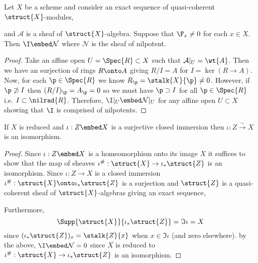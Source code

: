 \documentclass[12pt]{article}
\begin{document}
\newcommand{\Nil}{\mathcal{N}}

\begin{lemma}
Let $X$ be a scheme and consider an exact sequence of quasi-coherent $\struct{X}$-modules,
\begin{center}
\end{center}
and $\mathcal{A}$ is a sheaf of $\struct{X}$-algebra. 
Suppose that $\F_x \neq 0$ for each $x \in X$. Then $\I \embed \Nil$ where $\Nil$ is the sheaf of nilpotent.
\end{lemma}

\begin{proof}
Take an affine open $U = \Spec{R} \subset X$ such that $\mathcal{A} |_{U} = \wt{A}$. Then we have an surjection of rings $R \onto A$ giving $R/I = A$ for $I = \ker{(R \to A)}$. Now, for each $\p \in \Spec{R}$ we know $R_\p = \stalk{X}{\p} \neq 0$. However, if $\p \not\supset I$ then $(R/I)_\p = A_\p = 0$ so we must have $\p \supset I$ for all $\p \in \Spec{R}$ i.e. $I \subset \nilrad{R}$. Therefore, $\I |_U \embed \Nil|_U$ for any affine open $U \subset X$ showing that $\I$ is comprised of nilpotents. 
\end{proof}

\begin{corollary}
If $X$ is reduced and $\iota : Z \embed X$ is a surjective closed immersion then $\iota : Z \xrightarrow{\sim} X$ is an isomorphism. 
\end{corollary}

\begin{proof}
Since $\iota: Z \embed X$ is a homeomorphism onto its image $X$ it suffices to show that the map of sheaves $\iota^\# : \struct{X} \to \iota_* \struct{Z}$ is an isomorphism. Since $\iota : Z \to X$ is a closed immersion $\iota^\# : \struct{X} \onto \iota_* \struct{Z}$ is a surjection and $\struct{Z}$ is a quasi-coherent sheaf of $\struct{X}$-algebras giving an exact sequence,
\begin{center}
\end{center} Furthermore, 
\[ \Supp{\struct{X}}{\iota_* \struct{Z}} = \Im{\iota} = X \]
since $(\iota_* \struct{Z})_x = \stalk{Z}{x}$ when $x \in \Im{\iota}$ (and zero elsewhere). by the above, $\I \embed \Nil = 0$ since $X$ is reduced to $\iota^\# : \struct{X} \to \iota_* \struct{Z}$ is an isomorphism.  
\end{proof}
\end{document}
